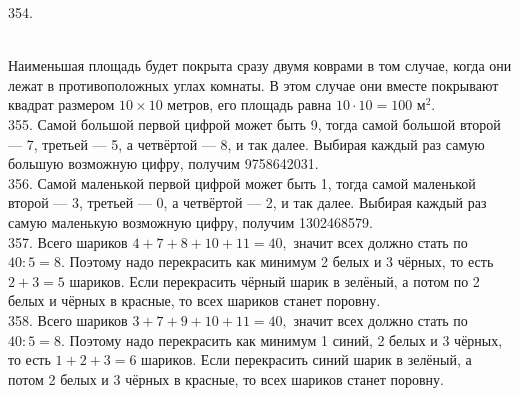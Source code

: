 \documentclass[12pt]{article}
\begin{document}
354. \begin{figure}[ht!]
\end{figure}\\
Наименьшая площадь будет покрыта сразу двумя коврами в том случае, когда они лежат в противоположных углах комнаты. В этом случае они вместе покрывают квадрат размером $10\times10$ метров, его площадь равна $10\cdot10=100\text{ м}^2.$\\
355. Самой большой первой цифрой может быть 9, тогда самой большой второй --- 7, третьей --- 5, а четвёртой --- 8, и так далее. Выбирая каждый раз самую большую возможную цифру, получим 9758642031.\\
356. Самой маленькой первой цифрой может быть 1, тогда самой маленькой второй --- 3, третьей --- 0, а четвёртой --- 2, и так далее. Выбирая каждый раз самую маленькую возможную цифру, получим 1302468579.\\
357. Всего шариков $4+7+8+10+11=40,$ значит всех должно стать по $40:5=8.$ Поэтому надо перекрасить как минимум 2 белых и 3 чёрных, то есть $2+3=5$ шариков. Если перекрасить чёрный шарик в зелёный, а потом по 2 белых и чёрных в красные, то всех шариков станет поровну.\\
358. Всего шариков $3+7+9+10+11=40,$ значит всех должно стать по $40:5=8.$ Поэтому надо перекрасить как минимум 1 синий, 2 белых и 3 чёрных, то есть $1+2+3=6$ шариков. Если перекрасить синий шарик в зелёный, а потом 2 белых и 3 чёрных в красные, то всех шариков станет поровну.\\
\end{document}
